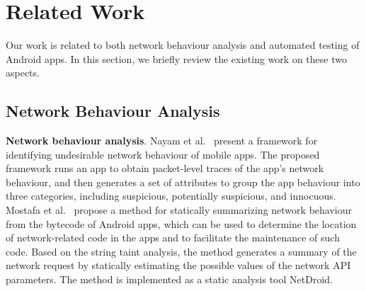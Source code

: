 \documentclass[sigconf,review, anonymous]{acmart}
\begin{document}
\section{Related Work}\label{relatedwork}
Our work is related to both network behaviour analysis and automated testing of Android apps. In this section, we briefly review the existing work on these two aspects.

\subsection{Network Behaviour Analysis}

\textbf{Network behaviour analysis}. Nayam et al.~\cite{NayamLCS16} present a framework for identifying undesirable network behaviour of mobile apps. The proposed framework runs an app to obtain packet-level traces of the app's network behaviour, and then generates a set of attributes to group the app behaviour into three categories, including suspicious, potentially suspicious, and innocuous. Mostafa et al.~\cite{MostafaRW17} propose a method for statically summarizing network behaviour from the bytecode of Android apps, which can be used to determine the location of network-related code in the apps and to facilitate the maintenance of such code. Based on the string taint analysis, the method generates a summary of the network request by statically estimating the possible values of the network API parameters. The method is implemented as a static analysis tool \textsf{NetDroid}.

\end{document}
